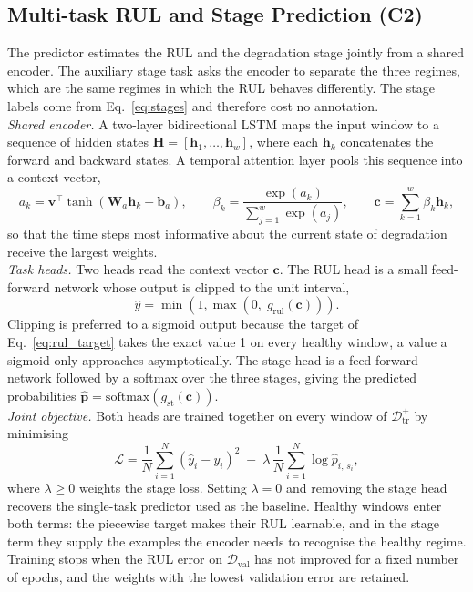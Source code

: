 \subsection{Multi-task RUL and Stage Prediction (C2)}
\label{sec:c2_multitask}

The predictor estimates the RUL and the degradation stage jointly from
a shared encoder. The auxiliary stage task asks the encoder to
separate the three regimes, which are the same regimes in which the
RUL behaves differently. The stage labels come from
Eq.~\eqref{eq:stages} and therefore cost no annotation.\\

\textit{Shared encoder.} A two-layer bidirectional LSTM maps the input
window to a sequence of hidden states
$\mathbf{H} = [\mathbf{h}_1, \dots, \mathbf{h}_w]$, where each
$\mathbf{h}_k$ concatenates the forward and backward states. A temporal
attention layer pools this sequence into a context vector,
\begin{equation}
  a_k = \mathbf{v}^{\top} \tanh\left( \mathbf{W}_a \mathbf{h}_k +
  \mathbf{b}_a \right), \qquad
  \beta_k = \frac{\exp(a_k)}{\sum_{j=1}^{w} \exp(a_j)}, \qquad
  \mathbf{c} = \sum_{k=1}^{w} \beta_k \mathbf{h}_k ,
  \label{eq:attention}
\end{equation}
so that the time steps most informative about the current state of
degradation receive the largest weights.\\

\textit{Task heads.} Two heads read the context vector $\mathbf{c}$.
The RUL head is a small feed-forward network whose output is clipped to
the unit interval,
\begin{equation}
  \hat{y} = \min\left( 1, \max\left( 0, \; g_{\mathrm{rul}}(\mathbf{c})
  \right) \right).
  \label{eq:rul_head}
\end{equation}
Clipping is preferred to a sigmoid output because the target of
Eq.~\eqref{eq:rul_target} takes the exact value 1 on every healthy
window, a value a sigmoid only approaches asymptotically. The stage
head is a feed-forward network followed by a softmax over the three
stages, giving the predicted probabilities
$\hat{\mathbf{p}} = \mathrm{softmax}(g_{\mathrm{st}}(\mathbf{c}))$.\\

\textit{Joint objective.} Both heads are trained together on every
window of $\mathcal{D}_{\mathrm{tr}}^{+}$ by minimising
\begin{equation}
  \mathcal{L} = \frac{1}{N} \sum_{i=1}^{N} \left( \hat{y}_i - y_i
  \right)^2
  \;-\; \lambda \, \frac{1}{N} \sum_{i=1}^{N} \log \hat{p}_{i,\,s_i},
  \label{eq:mt_loss}
\end{equation}
where $\lambda \geq 0$ weights the stage loss. Setting $\lambda = 0$
and removing the stage head recovers the single-task predictor used as
the baseline. Healthy windows enter both terms: the piecewise target
makes their RUL learnable, and in the stage term they supply the
examples the encoder needs to recognise the healthy regime. Training
stops when the RUL error on $\mathcal{D}_{\mathrm{val}}$ has not
improved for a fixed number of epochs, and the weights with the lowest
validation error are retained.



